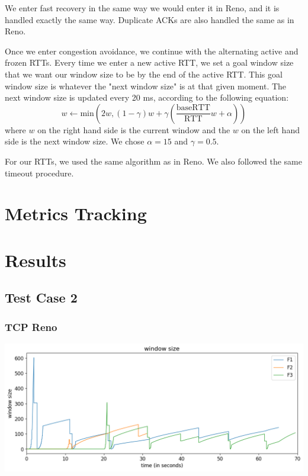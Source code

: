 \documentclass{article}
\begin{document}
We enter fast recovery in the same way we would enter it in Reno, and it is handled exactly the same way. Duplicate ACKs are also handled the same as in Reno.

Once we enter congestion avoidance, we continue with the alternating active and frozen RTTs. Every time we enter a new active RTT, we set a goal window size that we want our window size to be by the end of the active RTT. This goal window size is whatever the "next window size" is at that given moment. The next window size is updated every 20 ms, according to the following equation: $$ w \leftarrow \textrm{min}(2w, (1-\gamma)w + \gamma(\frac{\textrm{baseRTT}}{\textrm{RTT}}w + \alpha)) $$
where $w$ on the right hand side is the current window and the $w$ on the left hand side is the next window size. We chose $\alpha = 15$ and $\gamma = 0.5$. 

For our RTTs, we used the same algorithm as in Reno. We also followed the same timeout procedure.


\section{Metrics Tracking}

\section{Results}


\subsection{Test Case 2}

\subsubsection{TCP Reno}

\includegraphics[width = \textwidth]{"test_case2_reno window size"}
\end{document}
